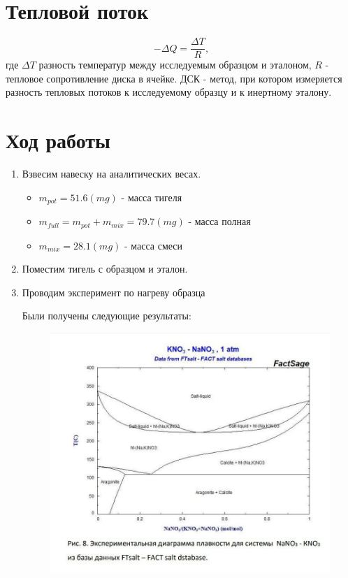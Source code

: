 \documentclass[a4paper,12pt]{article} %
\begin{document}
\section{Тепловой поток}
\begin{equation}
    -\Delta Q = \frac{\Delta T}{R},
\end{equation}
где $\Delta T$ разность температур между исследуемым образцом и эталоном, $R$ - тепловое сопротивление диска в ячейке. 
ДСК - метод, при котором измеряется разность тепловых потоков к исследуемому образцу и к инертному эталону.

\section{Ход работы}
\begin{enumerate}
    \item Взвесим навеску на аналитических весах.
    \begin{itemize}
        \item    $m_{pot} = 51.6 (mg) $ - масса тигеля 
        \item    $m_{full} = m_{pot} + m_{mix} = 79.7 (mg)$ - масса полная 
        \item    $m_{mix} = 28.1 (mg)$ - масса смеси 
        
    \end{itemize}
    \item Поместим тигель с образцом и эталон.
    \item Проводим эксперимент по нагреву образца 

    Были получены следующие результаты:
\begin{figure}[H]
    \centering
    \includegraphics[width = 180 mm]{gr_5.jpg}
\end{figure}


\end{enumerate}
\end{document}
